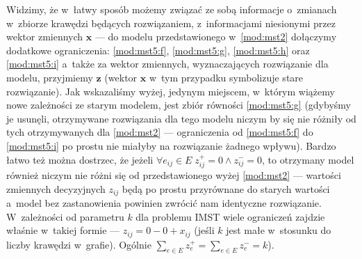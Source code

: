 Widzimy, że w~łatwy sposób możemy związać ze sobą informacje o~zmianach w~zbiorze krawędzi będących rozwiązaniem, z~informacjami niesionymi przez wektor zmiennych $\textbf{x}$ --- do modelu przedstawionego w~\ref{mod:mst2} dołączymy dodatkowe ograniczenia: \ref{mod:mst5:f}, \ref{mod:mst5:g}, \ref{mod:mst5:h} oraz \ref{mod:mst5:i} a~także za wektor zmiennych, wyznaczających rozwiązanie dla modelu, przyjmiemy $\textbf{z}$ (wektor $\textbf{x}$ w~tym przypadku symbolizuje stare rozwiązanie).
Jak wskazaliśmy wyżej, jedynym miejscem, w~którym wiążemy nowe zależności ze starym modelem, jest zbiór równości \ref{mod:mst5:g} (gdybyśmy je usunęli, otrzymywane rozwiązania dla tego modelu niczym by się nie różniły od tych otrzymywanych dla \ref{mod:mst2} --- ograniczenia od \ref{mod:mst5:f} do \ref{mod:mst5:i} po prostu nie miałyby na rozwiązanie żadnego wpływu).
Bardzo łatwo też można dostrzec, że jeżeli $\forall e_{ij} \in E \; z_{ij}^{+} = 0 \wedge z_{ij}^{-} = 0$, to otrzymany model również niczym nie różni się od przedstawionego wyżej \ref{mod:mst2} --- wartości zmiennych decyzyjnych $z_{ij}$ będą po prostu przyrównane do starych wartości a~model bez zastanowienia powinien zwrócić nam identyczne rozwiązanie.
W~zależności od parametru $k$ dla problemu \textsc{IMST} wiele ograniczeń zajdzie właśnie w~takiej formie --- $z_{ij} = 0 - 0 + x_{ij}$ (jeśli $k$ jest małe w~stosunku do liczby krawędzi w~grafie).
Ogólnie $\sum_{e \in E} z_{e}^{+} = \sum_{e \in E} z_{e}^{-} = k$).


